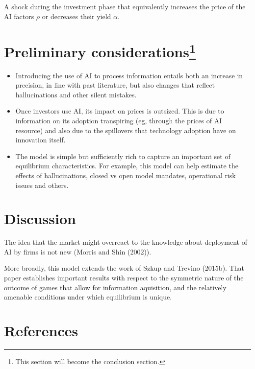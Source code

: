\documentclass[
]{article}
\theoremstyle{plain}
\theoremstyle{remark}
\begin{document}
A shock during the investment phase that equivalently increases the
price of the AI factors \(\rho\) or decreases their yield \(\alpha\).

\hypertarget{preliminary-considerationsconcl}{%
\section[Preliminary considerations]{\texorpdfstring{Preliminary
considerations\footnote{This section will become the conclusion section.}}{Preliminary considerations}}\label{preliminary-considerationsconcl}}

\begin{itemize}
\item
  Introducing the use of AI to process information entails both an
  increase in precision, in line with past literature, but also changes
  that reflect hallucinations and other silent mistakes.
\item
  Once investors use AI, its impact on prices is outsized. This is due
  to information on its adoption transpiring (eg, through the prices of
  AI resource) and also due to the spillovers that technology adoption
  have on innovation itself.
\item
  The model is simple but sufficiently rich to capture an important set
  of equilibrium characteristics. For example, this model can help
  estimate the effects of hallucinations, closed vs open model mandates,
  operational risk issues and others.
\end{itemize}

\hypertarget{discussion}{%
\section{Discussion}\label{discussion}}

The idea that the market might overreact to the knowledge about
deployment of AI by firms is not new (Morris and Shin (2002)).

More broadly, this model extends the work of Szkup and Trevino (2015b).
That paper establishes important results with respect to the symmetric
nature of the outcome of games that allow for information aquisition,
and the relatively amenable conditions under which equilibrium is
unique.

\hypertarget{references}{%
\section*{References}\label{references}}
\end{document}
